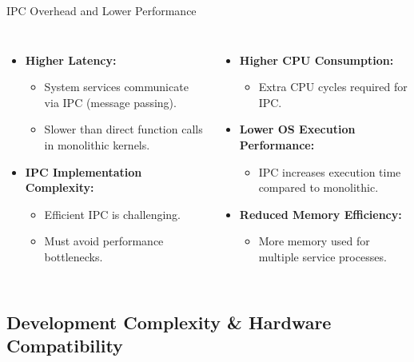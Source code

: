 \documentclass[aspectratio=169, table]{beamer}
\begin{document}
\begin{frame}{IPC Overhead and Lower Performance}
\vspace{20pt}
\begin{columns}
\begin{itemize}
	\item \textbf{Higher Latency:}
	\begin{itemize}
		\item System services communicate via IPC (message passing).
		\item Slower than direct function calls in monolithic kernels.
	\end{itemize}
	\item \textbf{IPC Implementation Complexity:}
	\begin{itemize}
		\item Efficient IPC is challenging.
		\item Must avoid performance bottlenecks.
	\end{itemize}
\end{itemize}
\begin{itemize}
	\item \textbf{Higher CPU Consumption:}
	\begin{itemize}
		\item Extra CPU cycles required for IPC.
	\end{itemize}
	\item \textbf{Lower OS Execution Performance:}
	\begin{itemize}
		\item IPC increases execution time compared to monolithic.
	\end{itemize}
	\item \textbf{Reduced Memory Efficiency:}
	\begin{itemize}
		\item More memory used for multiple service processes.
	\end{itemize}
\end{itemize}
\end{columns}
\end{frame}

\subsection{Development Complexity \& Hardware Compatibility}
\end{document}
